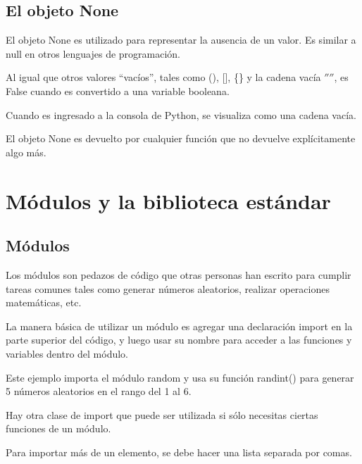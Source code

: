 \documentclass{report}
\newcommand{\doble}[1]{``#1''}
\begin{document}
\section{El objeto None}

El objeto None es utilizado para representar la ausencia de un valor. Es similar a null en otros lenguajes de programación.

Al igual que otros valores \doble{vacíos}, tales como (), [], \{\} y la cadena vacía $''$$''$, es False cuando es convertido a una variable booleana.




Cuando es ingresado a la consola de Python, se visualiza como una cadena vacía.


El objeto None es devuelto por cualquier función que no devuelve explícitamente algo más.


\clearpage\chapter{Módulos y la biblioteca estándar}

\section{Módulos}

Los módulos son pedazos de código que otras personas han escrito para cumplir tareas comunes tales como generar números aleatorios, realizar operaciones matemáticas, etc.

La manera básica de utilizar un módulo es agregar una declaración import en la parte superior del código, y luego usar su nombre para acceder a las funciones y variables dentro del módulo.


Este ejemplo importa el módulo random y usa su función randint() para generar 5 números aleatorios en el rango del 1 al 6.

Hay otra clase de import que puede ser utilizada si sólo necesitas ciertas funciones de un módulo.


Para importar más de un elemento, se debe hacer una lista separada por comas.
\end{document}
